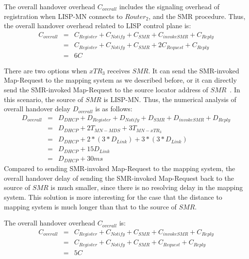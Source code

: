 {The overall handover overhead $C_{overall}$ includes the signaling overhead of registration when LISP-MN connects to $Router_2$, and the SMR procedure. Thus, the overall handover overhead related to LISP control plane is:
\begin{eqnarray}
C_{overall} &=& C_{Register} + C_{Notify} + C_{SMR} + C_{invokeSMR} + C_{Reply} \nonumber \\
&=& C_{Register} + C_{Notify} + C_{SMR} + 2C_{Request} + C_{Reply} \nonumber \\
&=& 6 C
\end{eqnarray}

There are two options when $xTR_3$ receives $SMR$. It can send the SMR-invoked Map-Request to the mapping system as we described before, or it can directly send the SMR-invoked Map-Request to the source locator address of $SMR$~\cite{rfc6830}. In this scenario, the source of $SMR$ is LISP-MN. Thus, the numerical analysis of overall handover delay $D_{overall}$ is as follows:
\begin{eqnarray}
D_{overall} &=& D_{DHCP} + D_{Register} + D_{Notify} + D_{SMR} + D_{invokeSMR} + D_{Reply} \nonumber \\
&=& D_{DHCP} + 2T_{MN-MDS} + 3T_{MN-xTR_3}  \nonumber \\
&=& D_{DHCP} + 2* (3*D_{Link}) + 3*(3*D_{Link}) \nonumber \\
&=& D_{DHCP} + 15D_{Link}  \\
&=& D_{DHCP} + 30 ms \nonumber
\end{eqnarray}
Compared to sending SMR-invoked Map-Request to the mapping system, the overall handover delay of sending the SMR-invoked Map-Request back to the source of $SMR$ is much smaller, since there is no resolving delay in the mapping system. This solution is more interesting for the case that the distance to mapping system is much longer than that to the source of $SMR$.

The overall handover overhead $C_{overall}$ is:
\begin{eqnarray}
C_{overall} &=& C_{Register} + C_{Notify} + C_{SMR} + C_{invokeSMR} + C_{Reply} \nonumber \\
&=& C_{Register} + C_{Notify} + C_{SMR} + C_{Request} + C_{Reply} \nonumber \\
&=& 5 C
\end{eqnarray}

}
